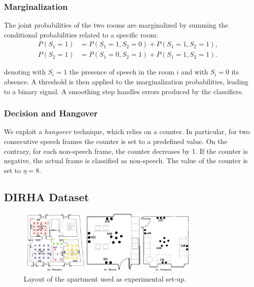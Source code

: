 \subsubsection{Marginalization}
The joint probabilities of the two rooms are marginalized by summing the conditional probabilities related to a specific room:
\begin{align}
P(S_1=1) &= P(S_1=1, S_2=0) + P(S_1=1, S_2=1), \\
P(S_2=1) &= P(S_1=0, S_2=1) + P(S_1=1, S_2=1).
\end{align}

denoting with $S_i=1$ the presence of speech in the room $i$ and with $S_i=0$ its absence.
A threshold is then applied to the marginalization probabilities, leading to a binary signal. A smoothing step handles errors produced by the classifiers.

\subsubsection{Decision and Hangover}

We exploit a \emph{hangover} technique, which relies on a counter. In particular, for two consecutive speech frames  the counter is set to a predefined value. On the contrary, for each non-speech frame, the counter decreases by 1. If the counter is negative, the actual frame is classified as non-speech. The value of the counter is set to $\eta=8$.

\subsection{DIRHA Dataset}

\begin{figure}[h]
 \centering
 \includegraphics[width=0.8\textwidth]{img/plan}
 \caption{Layout of the apartment used as experimental set-up.}
 \label{fig:plan}
\end{figure}

